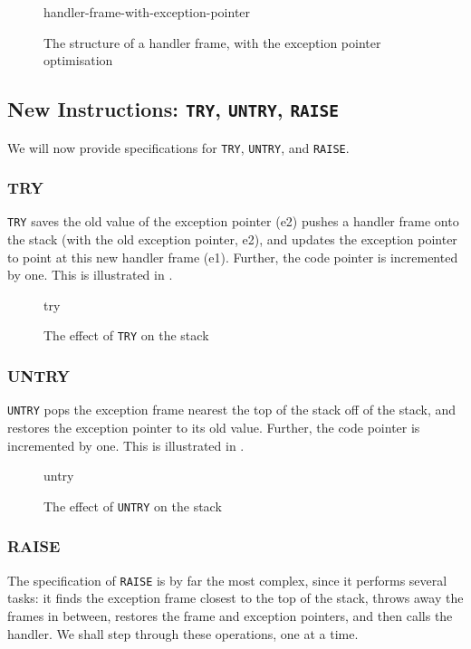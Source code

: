 \begin{figure}[H]
    \centering
    {handler-frame-with-exception-pointer}
    \caption{The structure of a handler frame, with the exception pointer optimisation}
    \label{fig:handler-frame-with-exception-pointer}
\end{figure}

\subsection{New Instructions: \texttt{TRY}, \texttt{UNTRY}, \texttt{RAISE}}
We will now provide specifications for \texttt{TRY}, \texttt{UNTRY}, and \texttt{RAISE}. 

\subsubsection{TRY}
\texttt{TRY} saves the old value of the exception pointer (e2) pushes a handler frame onto the stack (with the old exception pointer, e2), and updates the exception pointer to point at this new handler frame (e1). Further, the code pointer is incremented by one. This is illustrated in .

\begin{figure}[H]
    \centering
    {try}
    \caption{The effect of \texttt{TRY} on the stack}
    \label{fig:try-specification}
\end{figure}

\subsubsection{UNTRY}
\texttt{UNTRY} pops the exception frame nearest the top of the stack off of the stack, and restores the exception pointer to its old value. Further, the code pointer is incremented by one. This is illustrated in .

\begin{figure}[H]
    \centering
    {untry}
    \caption{The effect of \texttt{UNTRY} on the stack}
    \label{fig:untry-specification}
\end{figure}

\subsubsection{RAISE}\label{section:raise-specification}
The specification of \texttt{RAISE} is by far the most complex, since it performs several tasks: it finds the exception frame closest to the top of the stack, throws away the frames in between, restores the frame and exception pointers, and then calls the handler. We shall step through these operations, one at a time.

